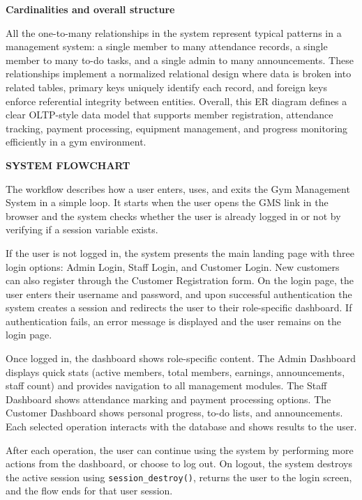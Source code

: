 \documentclass[12pt,a4paper]{report}
\begin{document}
\textbf{Cardinalities and overall structure}

All the one-to-many relationships in the system represent typical patterns in a management system: a single member to many attendance records, a single member to many to-do tasks, and a single admin to many announcements. These relationships implement a normalized relational design where data is broken into related tables, primary keys uniquely identify each record, and foreign keys enforce referential integrity between entities. Overall, this ER diagram defines a clear OLTP-style data model that supports member registration, attendance tracking, payment processing, equipment management, and progress monitoring efficiently in a gym environment.

\newpage
\vspace*{\fill}
\begin{center}
{\LARGE \textbf{SYSTEM FLOWCHART}}
\end{center}
\vspace*{\fill}

\newpage
The workflow describes how a user enters, uses, and exits the Gym Management System in a simple loop. It starts when the user opens the GMS link in the browser and the system checks whether the user is already logged in or not by verifying if a session variable exists.

If the user is not logged in, the system presents the main landing page with three login options: Admin Login, Staff Login, and Customer Login. New customers can also register through the Customer Registration form. On the login page, the user enters their username and password, and upon successful authentication the system creates a session and redirects the user to their role-specific dashboard. If authentication fails, an error message is displayed and the user remains on the login page.

Once logged in, the dashboard shows role-specific content. The Admin Dashboard displays quick stats (active members, total members, earnings, announcements, staff count) and provides navigation to all management modules. The Staff Dashboard shows attendance marking and payment processing options. The Customer Dashboard shows personal progress, to-do lists, and announcements. Each selected operation interacts with the database and shows results to the user.

After each operation, the user can continue using the system by performing more actions from the dashboard, or choose to log out. On logout, the system destroys the active session using \texttt{session\_destroy()}, returns the user to the login screen, and the flow ends for that user session.
\end{document}
